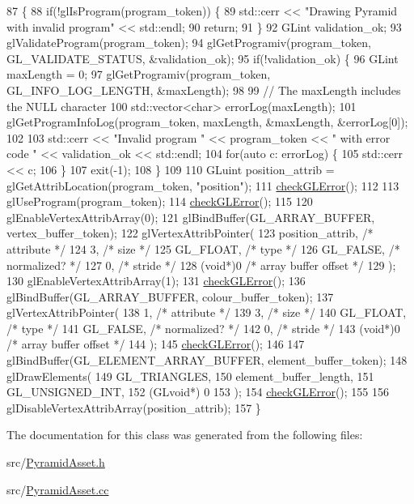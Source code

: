 \begin{DoxyCode}
87                                             \{
88   \textcolor{keywordflow}{if}(!glIsProgram(program\_token)) \{
89     std::cerr << \textcolor{stringliteral}{"Drawing Pyramid with invalid program"} << std::endl;
90     \textcolor{keywordflow}{return};
91   \}
92   GLint validation\_ok;
93   glValidateProgram(program\_token);
94   glGetProgramiv(program\_token, GL\_VALIDATE\_STATUS, &validation\_ok);
95   \textcolor{keywordflow}{if}(!validation\_ok) \{
96     GLint maxLength = 0;
97     glGetProgramiv(program\_token, GL\_INFO\_LOG\_LENGTH, &maxLength);
98 
99     \textcolor{comment}{// The maxLength includes the NULL character}
100     std::vector<char> errorLog(maxLength);
101     glGetProgramInfoLog(program\_token, maxLength, &maxLength, &errorLog[0]);
102 
103     std::cerr << \textcolor{stringliteral}{"Invalid program "} << program\_token << \textcolor{stringliteral}{" with error code "} << validation\_ok << std::endl;
104     \textcolor{keywordflow}{for}(\textcolor{keyword}{auto} c: errorLog) \{
105       std::cerr << c;
106     \}
107     exit(-1);
108   \}
109 
110   GLuint position\_attrib = glGetAttribLocation(program\_token, \textcolor{stringliteral}{"position"});
111   \hyperlink{PyramidAsset_8cc_a75f201b0e53e68726854997957322b8d}{checkGLError}();
112 
113   glUseProgram(program\_token);
114   \hyperlink{PyramidAsset_8cc_a75f201b0e53e68726854997957322b8d}{checkGLError}();
115 
120   glEnableVertexAttribArray(0);
121   glBindBuffer(GL\_ARRAY\_BUFFER, vertex\_buffer\_token);
122   glVertexAttribPointer(
123     position\_attrib,        \textcolor{comment}{/* attribute */}
124     3,        \textcolor{comment}{/* size */}
125     GL\_FLOAT,   \textcolor{comment}{/* type */}
126     GL\_FALSE,   \textcolor{comment}{/* normalized? */}
127     0,        \textcolor{comment}{/* stride */}
128     (\textcolor{keywordtype}{void}*)0    \textcolor{comment}{/* array buffer offset */}
129   );
130   glEnableVertexAttribArray(1);
131   \hyperlink{PyramidAsset_8cc_a75f201b0e53e68726854997957322b8d}{checkGLError}();
136   glBindBuffer(GL\_ARRAY\_BUFFER, colour\_buffer\_token);
137   glVertexAttribPointer(
138     1,        \textcolor{comment}{/* attribute */}
139     3,        \textcolor{comment}{/* size */}
140     GL\_FLOAT,   \textcolor{comment}{/* type */}
141     GL\_FALSE,   \textcolor{comment}{/* normalized? */}
142     0,        \textcolor{comment}{/* stride */}
143     (\textcolor{keywordtype}{void}*)0    \textcolor{comment}{/* array buffer offset */}
144   );
145   \hyperlink{PyramidAsset_8cc_a75f201b0e53e68726854997957322b8d}{checkGLError}();
146 
147   glBindBuffer(GL\_ELEMENT\_ARRAY\_BUFFER, element\_buffer\_token);
148   glDrawElements(
149     GL\_TRIANGLES,
150     element\_buffer\_length,
151     GL\_UNSIGNED\_INT,
152     (GLvoid*) 0
153   );
154   \hyperlink{PyramidAsset_8cc_a75f201b0e53e68726854997957322b8d}{checkGLError}();
155 
156   glDisableVertexAttribArray(position\_attrib);
157 \}
\end{DoxyCode}


The documentation for this class was generated from the following files\+:\begin{DoxyCompactItemize}
\item 
src/\hyperlink{PyramidAsset_8h}{Pyramid\+Asset.\+h}\item 
src/\hyperlink{PyramidAsset_8cc}{Pyramid\+Asset.\+cc}\end{DoxyCompactItemize}
